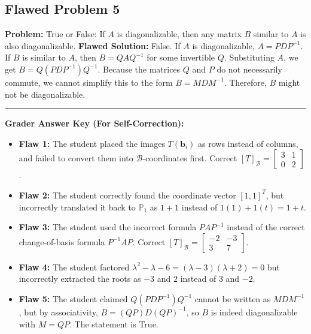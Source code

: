 \documentclass[11pt, a4paper]{article}
\theoremstyle{definition}
\theoremstyle{remark}
\begin{document}
\subsection{Flawed Problem 5}
\textbf{Problem:} True or False: If $A$ is diagonalizable, then any matrix $B$ similar to $A$ is also diagonalizable.
\textbf{Flawed Solution:}
False. If $A$ is diagonalizable, $A = PDP^{-1}$. If $B$ is similar to $A$, then $B = QAQ^{-1}$ for some invertible $Q$. Substituting $A$, we get $B = Q(PDP^{-1})Q^{-1}$. Because the matrices $Q$ and $P$ do not necessarily commute, we cannot simplify this to the form $B = M D M^{-1}$. Therefore, $B$ might not be diagonalizable.

\vspace{2em}
\hrule
\vspace{1em}
\textbf{Grader Answer Key (For Self-Correction):}
\begin{itemize}
    \item \textbf{Flaw 1:} The student placed the images $T(\mathbf{b}_i)$ as rows instead of columns, and failed to convert them into $\mathcal{B}$-coordinates first. Correct $[T]_\mathcal{B} = \begin{bmatrix} 3 & 1 \\ 0 & 2 \end{bmatrix}$.
    \item \textbf{Flaw 2:} The student correctly found the coordinate vector $[1, 1]^T$, but incorrectly translated it back to $\mathbb{P}_1$ as $1+1$ instead of $1(1) + 1(t) = 1+t$.
    \item \textbf{Flaw 3:} The student used the incorrect formula $PAP^{-1}$ instead of the correct change-of-basis formula $P^{-1}AP$. Correct $[T]_\mathcal{B} = \begin{bmatrix} -2 & -3 \\ 3 & 7 \end{bmatrix}$.
    \item \textbf{Flaw 4:} The student factored $\lambda^2 - \lambda - 6 = (\lambda - 3)(\lambda + 2) = 0$ but incorrectly extracted the roots as $-3$ and $2$ instead of $3$ and $-2$.
    \item \textbf{Flaw 5:} The student claimed $Q(PDP^{-1})Q^{-1}$ cannot be written as $MDM^{-1}$, but by associativity, $B = (QP)D(QP)^{-1}$, so $B$ is indeed diagonalizable with $M = QP$. The statement is True.
\end{itemize}
\end{document}
